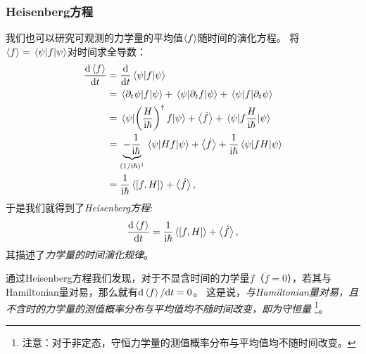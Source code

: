 \subsubsection{Heisenberg方程}

我们也可以研究可观测的力学量的平均值$\expval{f}$随时间的演化方程。
将$\expval{f}=\mel{\psi}{f}{\psi}$对时间求全导数：
\begin{equation}
\begin{aligned}
\frac{\dd \expval{f}}{\dd t}
&= \frac{\dd}{\dd t} \mel{\psi}{f}{\psi} \\
&= \mel{\partial_t \psi}{f}{\psi} + \mel{\psi}{\partial_t f}{\psi} + \mel{\psi}{f}{\partial_t \psi} \\
&= \mel{\psi}{\left(\frac{H}{\mathrm{i}\hbar}\right)^\dagger f}{\psi} + \expval{\dot{f}} + \mel{\psi}{f \frac{H}{\mathrm{i}\hbar}}{\psi} \\
&= \underbrace{-\frac{1}{\mathrm{i}\hbar}}_{(1/\mathrm{i}\hbar)^\dagger}\mel{\psi}{H f}{\psi} + \expval{\dot{f}} + \frac{1}{\mathrm{i}\hbar}\mel{\psi}{fH}{\psi} \\
&= \frac{1}{\mathrm{i}\hbar}\expval{[f,H]} + \expval{\dot{f}},
\end{aligned}
\end{equation}
于是我们就得到了\emph{Heisenberg方程}:
\begin{equation}
    \frac{\dd \expval{f}}{\dd t} = \frac{1}{\mathrm{i}\hbar}\expval{[f,H]} + \expval{\dot{f}},
\end{equation}
其描述了\emph{力学量的时间演化规律}。

通过Heisenberg方程我们发现，对于不显含时间的力学量$f$（$\dot{f}=0$），若其与Hamiltonian量对易，那么就有$\dd \expval{f}/\dd t = 0$。
这是说，\emph{与Hamiltonian量对易，且不含时的力学量的测值概率分布与平均值均不随时间改变，即为守恒量}
\footnote{注意：对于非定态，守恒力学量的测值概率分布与平均值均不随时间改变。}。
